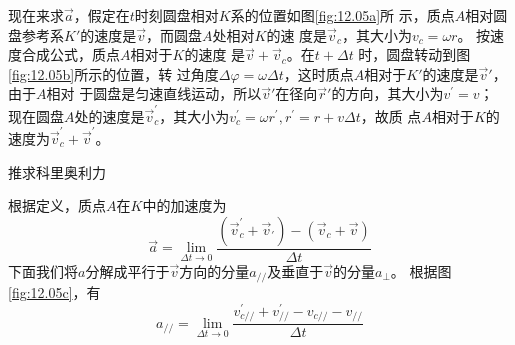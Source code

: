 现在来求$\vec{a}$，假定在$ t $时刻圆盘相对$ K $系的位置如图\ref{fig:12.05a}所
示，质点$ A $相对圆盘参考系$ K' $的速度是$\vec{v}$，而圆盘$ A $处相对$ K $的速
度是$\vec{v}_c$，其大小为$  v _ { c } = \omega r   $。
按速度合成公式，质点$ A $相对于$ K $的速度
是$ \vec{v}+\vec{v}_c $。在$  t + \Delta t  $ 时，圆盘转动到图\ref{fig:12.05b}所示的位置，转
过角度$  \Delta \varphi = \omega \Delta t   $，这时质点$ A $相对于$ K' $的速度是$ \vec{v}' $，由于$ A $相对
于圆盘是匀速直线运动，所以$ \vec{v} ' $在径向$\vec{r}'$的方向，其大小为$  v ^ { \prime } = v $；
现在圆盘$ A $处的速度是$ \vec{v} _ c ^ \prime $，其大小为$  v _ c ^ { \prime } = \omega r ^ { \prime } , r ^ { \prime } = r + v \Delta t $，故质
点$ A $相对于$ K $的速度为$ \vec{v} _ c ^ \prime + \vec{v} ^ \prime $。\vspace{-0.5em}
\begin{figurex}
    \centering
    \qquad
    \qquad
    \caption{推求科里奥利力}
    \label{fig:12.05}
\end{figurex}

根据定义，质点$ A $在$ K $中的加速度为
\begin{equation*}
    \vec{a} = \lim _ { \Delta t \to 0 } \frac { ( \vec{v} _ { c } ^ { \prime } + \vec{v} _ { \prime } ) - ( \vec{v} _ { c } + \vec{v} ) } { \Delta t }
\end{equation*}
下面我们将$ a $分解成平行于$\vec{v}$方向的分量$ a _ {//} $及垂直于$\vec{v}$的分量$ a _ \bot $。
根据图\ref{fig:12.05c}，有
\begin{equation*}
    a _ { // } = \lim_{ \Delta t \to 0 } \frac { v _ { c// } ^ { \prime } + v _ { // } ^ { \prime } - v _ { c// } - v _ { // } } { \Delta t }
\end{equation*}

